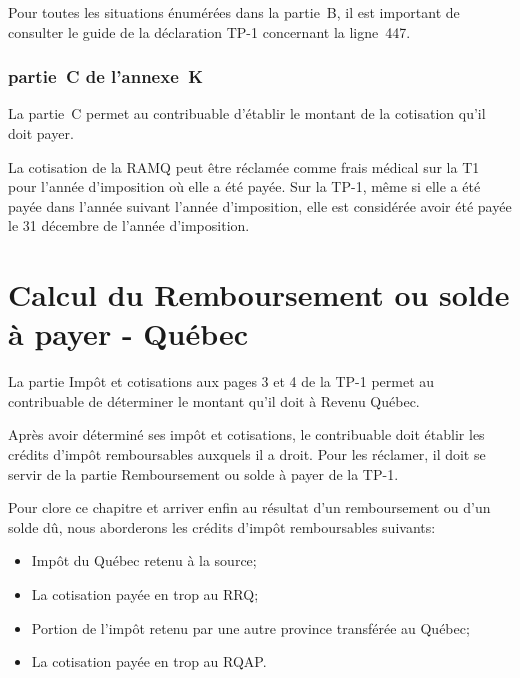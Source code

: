 \begin{note}
	Pour toutes les situations énumérées dans la partie~B, il est important de consulter le guide de la déclaration TP-1 concernant la ligne~447.
\end{note}

\subsubsection{partie~C de l'annexe~K}
La partie~C permet au contribuable d'établir le montant de la cotisation qu'il doit payer.

La cotisation de la RAMQ peut être réclamée comme frais médical sur la T1 pour l'année d'imposition où elle a été payée. Sur la TP-1, même si elle a été payée dans l'année suivant l'année d'imposition, elle est considérée avoir été payée le 31 décembre de l'année d'imposition. 




\section{Calcul du Remboursement ou solde à payer - Québec}
\begin{intro}
	La partie \og Impôt et cotisations \fg{} aux pages 3 et 4 de la TP-1 permet au contribuable de déterminer le montant qu'il doit à Revenu Québec.
	
	Après avoir déterminé ses impôt et cotisations, le contribuable doit établir les crédits d'impôt remboursables auxquels il a droit. Pour les réclamer, il doit se servir de la partie \og Remboursement ou solde à payer \fg{} de la TP-1.
\end{intro}

Pour clore ce chapitre et arriver enfin au résultat d'un remboursement ou d'un solde dû, nous aborderons les crédits d'impôt remboursables suivants:
\begin{itemize}
	\item Impôt du Québec retenu à la source;
	\item La cotisation payée en trop au RRQ;
	\item Portion de l'impôt retenu par une autre province transférée au Québec;
	\item La cotisation payée en trop au RQAP.
\end{itemize}

